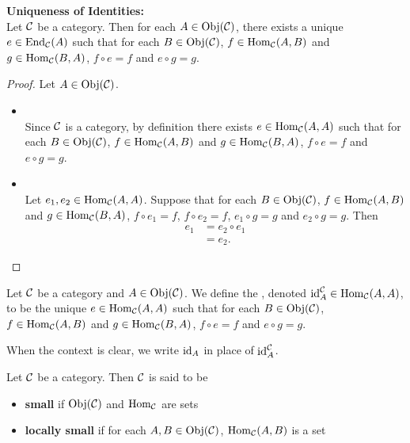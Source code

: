 \documentclass{book}
\begin{document}
	\begin{ex}  \textbf{Uniqueness of Identities:} \\
		Let $\mathcal{C}$ be a category. Then for each $A \in \operatorname{Obj}(\mathcal{C})$, there exists a unique $e \in \operatorname{End}_{\mathcal{C}}(A)$ such that for each $B \in \operatorname{Obj}(\mathcal{C})$, $f \in \operatorname{Hom}_{\mathcal{C}}(A, B)$ and $g \in \operatorname{Hom}_{\mathcal{C}}(B, A)$, $f \circ e = f$ and $e \circ g = g$.
	\end{ex}
	
	\begin{proof}
		Let $A \in \operatorname{Obj}(\mathcal{C})$. 
		\begin{itemize}
			\item {} \\
			Since $\mathcal{C}$ is a category, by definition there exists $e \in \operatorname{Hom}_{\mathcal{C}}(A, A)$ such that for each $B \in \operatorname{Obj}(\mathcal{C})$, $f \in \operatorname{Hom}_{\mathcal{C}}(A, B)$ and $g \in \operatorname{Hom}_{\mathcal{C}}(B, A)$, $f \circ e = f$ and $e \circ g = g$. 
			\item {} \\
			Let $e_1, e_2 \in \operatorname{Hom}_{\mathcal{C}}(A, A)$. Suppose that for each $B \in \operatorname{Obj}(\mathcal{C})$, $f \in \operatorname{Hom}_{\mathcal{C}}(A, B)$ and $g \in \operatorname{Hom}_{\mathcal{C}}(B, A)$, $f \circ e_1 = f$, $f \circ e_2 = f$, $e_1 \circ g = g$ and $e_2 \circ g = g$. Then 
			\begin{align*}
				e_1
				& = e_2 \circ e_1 \\
				& = e_2.
			\end{align*}
		\end{itemize}
	\end{proof}
	
	\begin{defn}
		Let $\mathcal{C}$ be a category and $A \in \operatorname{Obj}(\mathcal{C})$. We define the , denoted $\operatorname{id}_A^{\mathcal{C}} \in \operatorname{Hom}_{\mathcal{C}}(A, A)$, to be the unique $e \in \operatorname{Hom}_{\mathcal{C}}(A, A)$ such that for each $B \in \operatorname{Obj}(\mathcal{C})$, $f \in \operatorname{Hom}_{\mathcal{C}}(A, B)$ and $g \in \operatorname{Hom}_{\mathcal{C}}(B, A)$, $f \circ e = f$ and $e \circ g = g$.
	\end{defn}
	
	\begin{note}
		When the context is clear, we write $\operatorname{id}_A$ in place of $\operatorname{id}_A^{\mathcal{C}}$.
	\end{note}
	
	\begin{defn} \ld{12002}
		Let $\mathcal{C}$ be a category. Then $\mathcal{C}$ is said to be 
		\begin{itemize}
			\item \textbf{small} if $\operatorname{Obj}(\mathcal{C})$ and $\operatorname{Hom}_{\mathcal{C}}$ are sets
			\item \textbf{locally small} if for each $A,B \in \operatorname{Obj}(\mathcal{C})$, $\operatorname{Hom}_{\mathcal{C}}(A,B)$ is a set 
		\end{itemize}
	\end{defn}
	
\end{document}
